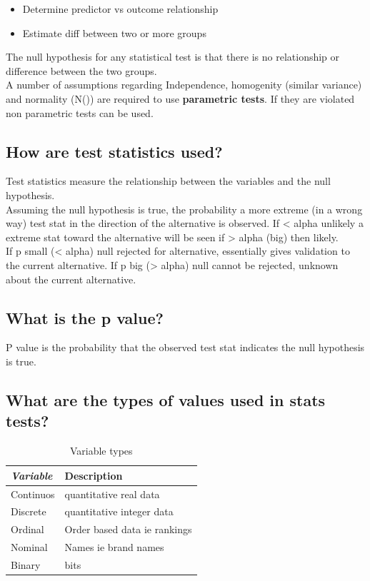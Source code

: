 \documentclass[11pt]{scrartcl} %
\begin{document}
\begin{itemize}
	\item Determine predictor vs outcome relationship
	\item Estimate diff between two or more groups
\end{itemize}

The null hypothesis for any statistical test is that there is no relationship or difference between the two groups.\\

A number of assumptions regarding Independence, homogenity (similar variance) and normality (N()) are required to use
\textbf{parametric tests}. If they are violated non parametric tests can be used.

\subsection{How are test statistics used?}

Test statistics measure the relationship between the variables and the null hypothesis.\\

Assuming the null hypothesis is true, the probability a more extreme (in a wrong way) test stat in the direction of the
alternative is observed. If < alpha unlikely a extreme stat toward the alternative will be seen if > alpha (big)
then likely.\\

If p small (< alpha) null rejected for alternative, essentially gives validation to the current alternative.
If p big (> alpha) null cannot be rejected, unknown about the current alternative.

\subsection{What is the p value?}

P value is the probability that the observed test stat indicates the null hypothesis is true.

\subsection{What are the types of values used in stats tests?}

\begin{table}[h] %
	\centering %
	\begin{tabular}{l l}
		\toprule
		\textit{Variable} & \textbf{Description} \\
		\midrule
		Continuos & quantitative real data\\
		Discrete & quantitative integer data\\
		Ordinal & Order based data ie rankings\\
		Nominal & Names ie brand names \\
		Binary & bits \\
		\bottomrule
	\end{tabular}
	\caption{Variable types}
\end{table}
\end{document}

